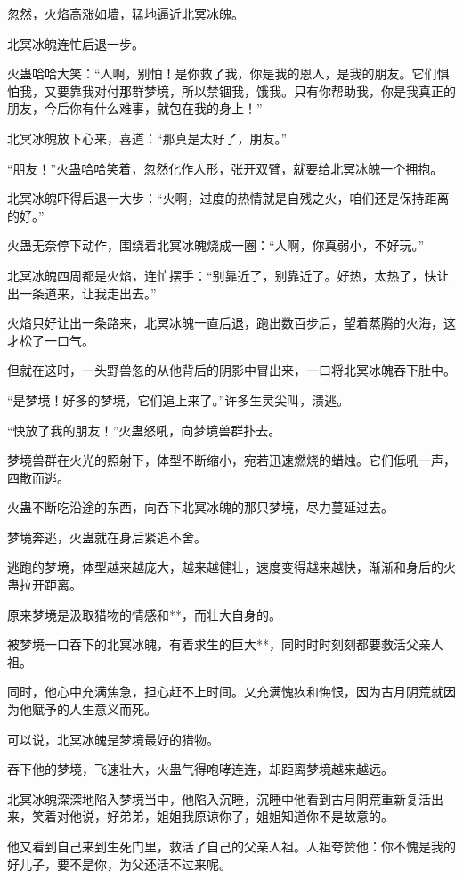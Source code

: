 \begin{this_body}
忽然，火焰高涨如墙，猛地逼近北冥冰魄。

北冥冰魄连忙后退一步。

火蛊哈哈大笑：“人啊，别怕！是你救了我，你是我的恩人，是我的朋友。它们惧怕我，又要靠我对付那群梦境，所以禁锢我，饿我。只有你帮助我，你是我真正的朋友，今后你有什么难事，就包在我的身上！”

北冥冰魄放下心来，喜道：“那真是太好了，朋友。”

“朋友！”火蛊哈哈笑着，忽然化作人形，张开双臂，就要给北冥冰魄一个拥抱。

北冥冰魄吓得后退一大步：“火啊，过度的热情就是自残之火，咱们还是保持距离的好。”

火蛊无奈停下动作，围绕着北冥冰魄烧成一圈：“人啊，你真弱小，不好玩。”

北冥冰魄四周都是火焰，连忙摆手：“别靠近了，别靠近了。好热，太热了，快让出一条道来，让我走出去。”

火焰只好让出一条路来，北冥冰魄一直后退，跑出数百步后，望着蒸腾的火海，这才松了一口气。

但就在这时，一头野兽忽的从他背后的阴影中冒出来，一口将北冥冰魄吞下肚中。

“是梦境！好多的梦境，它们追上来了。”许多生灵尖叫，溃逃。

“快放了我的朋友！”火蛊怒吼，向梦境兽群扑去。

梦境兽群在火光的照射下，体型不断缩小，宛若迅速燃烧的蜡烛。它们低吼一声，四散而逃。

火蛊不断吃沿途的东西，向吞下北冥冰魄的那只梦境，尽力蔓延过去。

梦境奔逃，火蛊就在身后紧追不舍。

逃跑的梦境，体型越来越庞大，越来越健壮，速度变得越来越快，渐渐和身后的火蛊拉开距离。

原来梦境是汲取猎物的情感和**，而壮大自身的。

被梦境一口吞下的北冥冰魄，有着求生的巨大**，同时时时刻刻都要救活父亲人祖。

同时，他心中充满焦急，担心赶不上时间。又充满愧疚和悔恨，因为古月阴荒就因为他赋予的人生意义而死。

可以说，北冥冰魄是梦境最好的猎物。

吞下他的梦境，飞速壮大，火蛊气得咆哮连连，却距离梦境越来越远。

北冥冰魄深深地陷入梦境当中，他陷入沉睡，沉睡中他看到古月阴荒重新复活出来，笑着对他说，好弟弟，姐姐我原谅你了，姐姐知道你不是故意的。

他又看到自己来到生死门里，救活了自己的父亲人祖。人祖夸赞他：你不愧是我的好儿子，要不是你，为父还活不过来呢。


\end{this_body}
